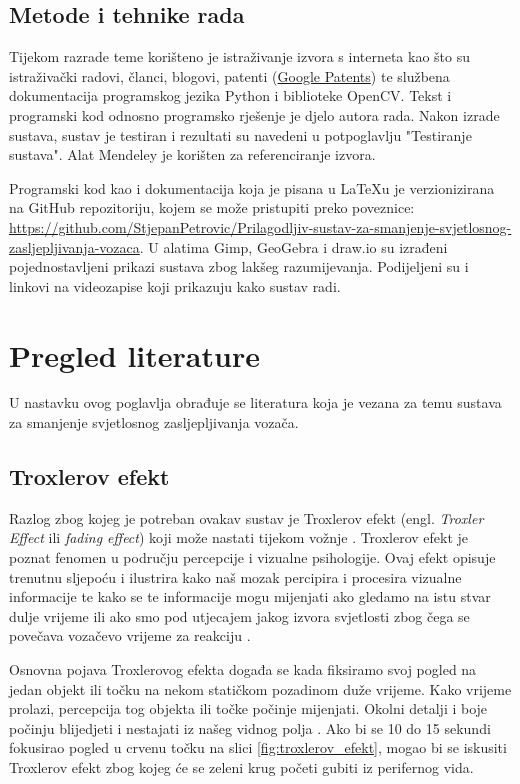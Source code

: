 \documentclass{foi}
\begin{document}
\section{Metode i tehnike rada}

Tijekom razrade teme korišteno je istraživanje izvora s interneta kao što su istraživački radovi, članci, blogovi, patenti (\href{https://patents.google.com/}{Google Patents}) te službena dokumentacija programskog jezika Python i biblioteke OpenCV. Tekst i programski kod odnosno programsko rješenje je djelo autora rada. Nakon izrade sustava, sustav je testiran i rezultati su navedeni u potpoglavlju "Testiranje sustava". Alat Mendeley je korišten za referenciranje izvora.

Programski kod kao i dokumentacija koja je pisana u LaTeXu je verzionizirana na GitHub repozitoriju, kojem se može pristupiti preko poveznice: \url{https://github.com/StjepanPetrovic/Prilagodljiv-sustav-za-smanjenje-svjetlosnog-zasljepljivanja-vozaca}. U alatima Gimp, GeoGebra i draw.io su izrađeni pojednostavljeni prikazi sustava zbog lakšeg razumijevanja. Podijeljeni su i linkovi na videozapise koji prikazuju kako sustav radi.

\chapter{Pregled literature}

U nastavku ovog poglavlja obrađuje se literatura koja je vezana za temu sustava za smanjenje svjetlosnog zasljepljivanja vozača.

\section{Troxlerov efekt}

Razlog zbog kojeg je potreban ovakav sustav je Troxlerov efekt (engl. \emph{Troxler Effect} ili \emph{fading effect}) koji može nastati tijekom vožnje \cite{Autoevolution2022}. Troxlerov efekt je poznat fenomen u području percepcije i vizualne psihologije. Ovaj efekt opisuje trenutnu sljepoću i ilustrira kako naš mozak percipira i procesira vizualne informacije te kako se te informacije mogu mijenjati ako gledamo na istu stvar dulje vrijeme ili ako smo pod utjecajem jakog izvora svjetlosti zbog čega se povečava vozačevo vrijeme za reakciju \cite[str. 208]{P2014}.

Osnovna pojava Troxlerovog efekta događa se kada fiksiramo svoj pogled na jedan objekt ili točku na nekom statičkom pozadinom duže vrijeme. Kako vrijeme prolazi, percepcija tog objekta ili točke počinje mijenjati. Okolni detalji i boje počinju blijedjeti i nestajati iz našeg vidnog polja \cite[str. 664]{Kanai2003}. Ako bi se 10 do 15 sekundi fokusirao pogled u crvenu točku na slici \ref{fig:troxlerov_efekt}, mogao bi se iskusiti Troxlerov efekt zbog kojeg će se zeleni krug početi gubiti iz perifernog vida.
\end{document}
